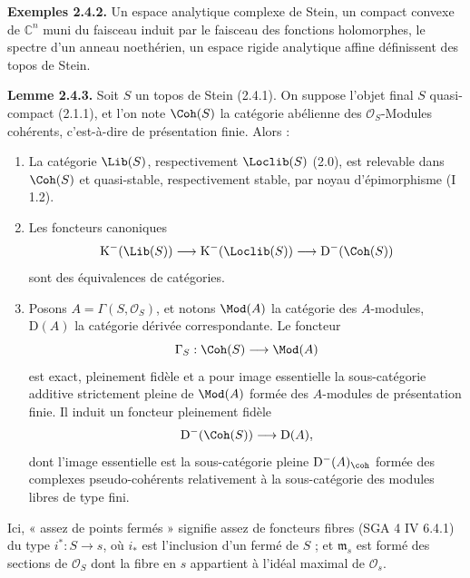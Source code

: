 \documentclass[11pt]{article}
\begin{document}
\textbf{Exemples 2.4.2.} Un espace analytique complexe de Stein, un compact convexe de $\mathbb C^n$ muni du faisceau induit par le faisceau des fonctions holomorphes, le spectre d'un anneau noethérien, un espace rigide analytique affine définissent des topos de Stein.

\textbf{Lemme 2.4.3.} Soit $S$ un topos de Stein (2.4.1). On suppose l'objet final $S$ quasi-compact (2.1.1), et l'on note $\Coh(S)$ la catégorie abélienne des $\mathcal O_S$-Modules cohérents, c'est-à-dire de présentation finie. Alors :
\begin{enumerate}[label=\alph*)]
\item La catégorie $\Lib(S)$, respectivement $\Loclib(S)$ (2.0), est relevable dans $\Coh(S)$ et quasi-stable, respectivement stable, par noyau d'épimorphisme (I 1.2).
\item Les foncteurs canoniques
\[
\mathrm K^{-}(\Lib(S))\longrightarrow\mathrm K^{-}(\Loclib(S))\longrightarrow\mathrm D^{-}(\Coh(S))
\]
sont des équivalences de catégories.
\item Posons $A=\Gamma(S,\mathcal O_S)$, et notons $\Mod(A)$ la catégorie des $A$-modules, $\mathrm D(A)$ la catégorie dérivée correspondante. Le foncteur
\[
\Gamma_S:\Coh(S)\longrightarrow\Mod(A)
\]
est exact, pleinement fidèle et a pour image essentielle la sous-catégorie additive strictement pleine de $\Mod(A)$ formée des $A$-modules de présentation finie. Il induit un foncteur pleinement fidèle
\[
\mathrm D^{-}(\Coh(S))\longrightarrow\mathrm D(A),
\]
dont l'image essentielle est la sous-catégorie pleine $\mathrm D^{-}(A)_{\coh}$ formée des complexes pseudo-cohérents relativement à la sous-catégorie des modules libres de type fini.
\end{enumerate}
Ici, « assez de points fermés » signifie assez de foncteurs fibres (SGA 4 IV 6.4.1) du type $i^*:S\to s$, où $i_*$ est l'inclusion d'un fermé de $S$ ; et $\mathfrak m_s$ est formé des sections de $\mathcal O_S$ dont la fibre en $s$ appartient à l'idéal maximal de $\mathcal O_s$.
\end{document}
